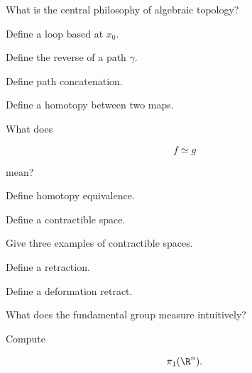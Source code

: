 \begin{exercise}[1]
What is the central philosophy of algebraic topology?
\end{exercise}

\begin{exercise}[1]
Define a loop based at \(x_0\).
\end{exercise}

\begin{exercise}[1]
Define the reverse of a path \(\gamma\).
\end{exercise}

\begin{exercise}[1]
Define path concatenation.
\end{exercise}

\begin{exercise}[1]
Define a homotopy between two maps.
\end{exercise}

\begin{exercise}[1]
What does

\[
f\simeq g
\]

mean?
\end{exercise}

\begin{exercise}[1]
Define homotopy equivalence.
\end{exercise}

\begin{exercise}[1]
Define a contractible space.
\end{exercise}

\begin{exercise}[1]
Give three examples of contractible spaces.
\end{exercise}

\begin{exercise}[1]
Define a retraction.
\end{exercise}

\begin{exercise}[1]
Define a deformation retract.
\end{exercise}

\begin{exercise}[1]
What does the fundamental group measure intuitively?
\end{exercise}

\begin{exercise}[1]
Compute

\[
\pi_1(\R^n).
\]
\end{exercise}

